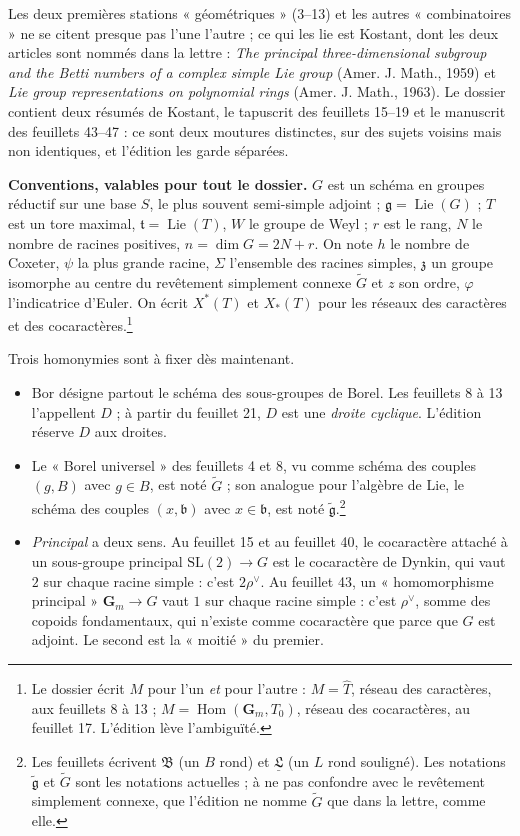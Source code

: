 \documentclass[11pt,a4paper]{article}
\begin{document}
Les deux premières stations « géométriques » (3--13) et les autres
« combinatoires » ne se citent presque pas l'une l'autre ; ce qui les lie est
Kostant, dont les deux articles sont nommés dans la lettre : \emph{The principal
three-dimensional subgroup and the Betti numbers of a complex simple Lie group}
(Amer. J. Math., 1959) et \emph{Lie group representations on polynomial rings}
(Amer. J. Math., 1963). Le dossier contient deux résumés de Kostant, le
tapuscrit des feuillets 15--19 et le manuscrit des feuillets 43--47 : ce sont
deux moutures distinctes, sur des sujets voisins mais non identiques, et
l'édition les garde séparées.

\textbf{Conventions, valables pour tout le dossier.} $G$ est un schéma en
groupes réductif sur une base $S$, le plus souvent semi-simple adjoint ;
$\mathfrak{g}=\operatorname{Lie}(G)$ ; $T$ est un tore maximal,
$\mathfrak{t}=\operatorname{Lie}(T)$, $W$ le groupe de Weyl ; $r$ est le rang,
$N$ le nombre de racines positives, $n=\dim G=2N+r$. On note $h$ le nombre de
Coxeter, $\psi$ la plus grande racine, $\Sigma$ l'ensemble des racines simples,
$\mathfrak{z}$ un groupe isomorphe au centre du revêtement simplement connexe
$\widetilde{G}$ et $z$ son ordre, $\varphi$ l'indicatrice d'Euler. On écrit
$X^{*}(T)$ et $X_{*}(T)$ pour les réseaux des caractères et des
cocaractères.\footnote{Le dossier écrit $M$ pour l'un \emph{et} pour l'autre :
$M=\widehat{T}$, réseau des caractères, aux feuillets 8 à 13 ;
$M=\operatorname{Hom}(\mathbf{G}_{m},T_{0})$, réseau des cocaractères, au
feuillet 17. L'édition lève l'ambiguïté.}

Trois homonymies sont à fixer dès maintenant.

\begin{itemize}
\item $\mathrm{Bor}$ désigne partout le schéma des sous-groupes de Borel. Les
  feuillets 8 à 13 l'appellent $D$ ; à partir du feuillet 21, $D$ est une
  \emph{droite cyclique}. L'édition réserve $D$ aux droites.
\item Le « Borel universel » des feuillets 4 et 8, vu comme schéma des couples
  $(g,B)$ avec $g\in B$, est noté $\widetilde{G}$ ; son analogue pour l'algèbre
  de Lie, le schéma des couples $(x,\mathfrak{b})$ avec $x\in\mathfrak{b}$, est
  noté $\widetilde{\mathfrak{g}}$.\footnote{Les feuillets écrivent
  $\mathfrak{B}$ (un $B$ rond) et $\underline{\mathfrak{L}}$ (un $L$ rond
  souligné). Les notations $\widetilde{\mathfrak{g}}$ et $\widetilde{G}$ sont
  les notations actuelles ; à ne pas confondre avec le revêtement simplement
  connexe, que l'édition ne nomme $\widetilde{G}$ que dans la lettre, comme
  elle.}
\item \emph{Principal} a deux sens. Au feuillet 15 et au feuillet 40, le
  cocaractère attaché à un sous-groupe principal $\mathrm{SL}(2)\to G$ est le
  cocaractère de Dynkin, qui vaut $2$ sur chaque racine simple : c'est
  $2\rho^{\vee}$. Au feuillet 43, un « homomorphisme principal »
  $\mathbf{G}_{m}\to G$ vaut $1$ sur chaque racine simple : c'est
  $\rho^{\vee}$, somme des copoids fondamentaux, qui n'existe comme
  cocaractère que parce que $G$ est adjoint. Le second est la « moitié » du
  premier.
\end{itemize}
\end{document}
